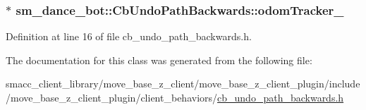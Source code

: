 \subsubsection[{\texorpdfstring{odom\+Tracker\+\_\+}{odomTracker_}}]{ $\ast$ sm\+\_\+dance\+\_\+bot\+::\+Cb\+Undo\+Path\+Backwards\+::odom\+Tracker\+\_\+\hspace{0.3cm}{\ttfamily [private]}}\hypertarget{classsm__dance__bot_1_1CbUndoPathBackwards_a75335993a9cd613c7aba93ccb518c645}{}\label{classsm__dance__bot_1_1CbUndoPathBackwards_a75335993a9cd613c7aba93ccb518c645}


Definition at line 16 of file cb\+\_\+undo\+\_\+path\+\_\+backwards.\+h.



The documentation for this class was generated from the following file\+:\begin{DoxyCompactItemize}
\item 
smacc\+\_\+client\+\_\+library/move\+\_\+base\+\_\+z\+\_\+client/move\+\_\+base\+\_\+z\+\_\+client\+\_\+plugin/include/move\+\_\+base\+\_\+z\+\_\+client\+\_\+plugin/client\+\_\+behaviors/\hyperlink{smacc__client__library_2move__base__z__client_2move__base__z__client__plugin_2include_2move__bascbc9ae7d3990516ddb2c98e15a09bcd2}{cb\+\_\+undo\+\_\+path\+\_\+backwards.\+h}\end{DoxyCompactItemize}
